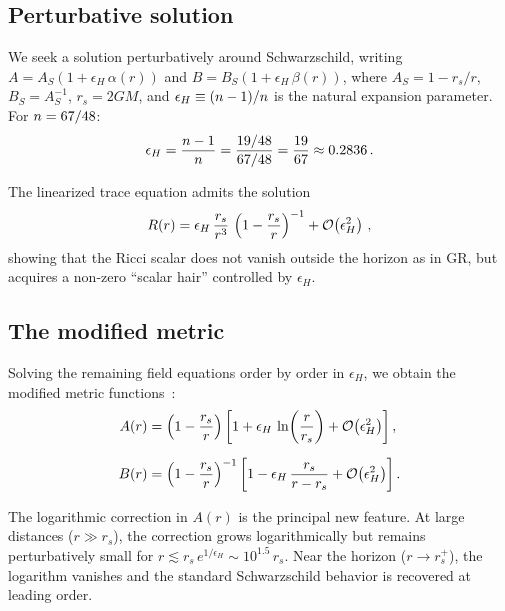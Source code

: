 \documentclass[amsmath,amssymb,aps,prd,twocolumn,superscriptaddress,nofootinbib]{revtex4-2}
\begin{document}
\subsection{Perturbative solution}

We seek a solution perturbatively around Schwarzschild, writing
$A = A_S(1 + \epsilon_H\,\alpha(r))$ and
$B = B_S(1 + \epsilon_H\,\beta(r))$, where $A_S = 1 - r_s/r$,
$B_S = A_S^{-1}$, $r_s = 2GM$, and $\epsilon_H \equiv (n-1)/n$
is the natural expansion parameter.  For $n = 67/48$:
\begin{equation}
  \epsilon_H = \frac{n - 1}{n}
             = \frac{19/48}{67/48}
             = \frac{19}{67}
             \approx 0.2836\,.
  \label{eq:epsilon_H}
\end{equation}

The linearized trace equation admits the solution~\cite{delaCruzDombriz2009,Nashed2019}
\begin{equation}
  R(r) = \epsilon_H\,\frac{r_s}{r^3}\,
         \left(1 - \frac{r_s}{r}\right)^{-1}
         + \mathcal{O}\!\left(\epsilon_H^2\right)\,,
  \label{eq:R_profile}
\end{equation}
showing that the Ricci scalar does not vanish outside the horizon
as in GR, but acquires a non-zero ``scalar hair'' controlled by
$\epsilon_H$.

\subsection{The modified metric}

Solving the remaining field equations order by order in
$\epsilon_H$, we obtain the modified metric
functions~\cite{Multamaki2006}:
\begin{align}
  A(r) &= \left(1 - \frac{r_s}{r}\right)
           \left[1 + \epsilon_H\,\ln\!\left(\frac{r}{r_s}\right)
           + \mathcal{O}\!\left(\epsilon_H^2\right)\right],
  \label{eq:A_solution} \\[6pt]
  B(r) &= \left(1 - \frac{r_s}{r}\right)^{-1}
           \left[1 - \epsilon_H\,\frac{r_s}{r - r_s}
           + \mathcal{O}\!\left(\epsilon_H^2\right)\right].
  \label{eq:B_solution}
\end{align}

The logarithmic correction in $A(r)$ is the principal new feature.
At large distances ($r \gg r_s$), the correction grows
logarithmically but remains perturbatively small for
$r \lesssim r_s\,e^{1/\epsilon_H} \sim 10^{1.5}\,r_s$.  Near
the horizon ($r \to r_s^+$), the logarithm vanishes and the
standard Schwarzschild behavior is recovered at leading order.
\end{document}
